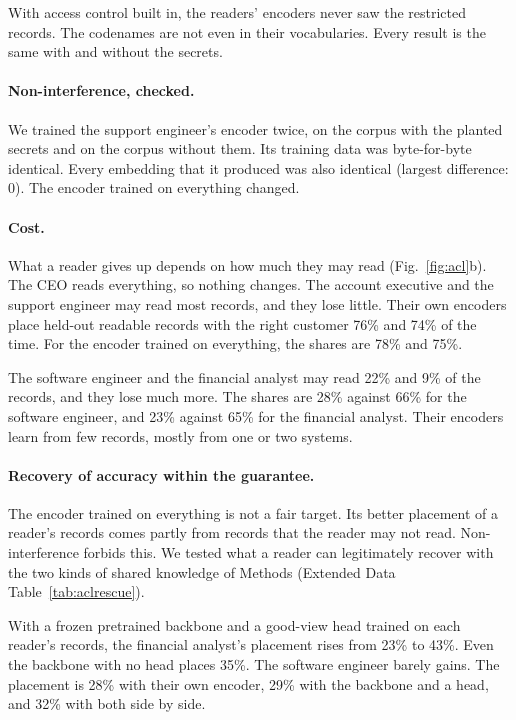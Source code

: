 \documentclass[11pt]{article}
\begin{document}
With access control built in, the readers' encoders never saw the restricted records. The codenames are not even in their vocabularies. Every result is the same with and without the secrets.

\paragraph{Non-interference, checked.} We trained the support engineer's encoder twice, on the corpus with the planted secrets and on the corpus without them. Its training data was byte-for-byte identical. Every embedding that it produced was also identical (largest difference: 0). The encoder trained on everything changed.

\paragraph{Cost.} What a reader gives up depends on how much they may read (Fig.~\ref{fig:acl}b). The CEO reads everything, so nothing changes. The account executive and the support engineer may read most records, and they lose little. Their own encoders place held-out readable records with the right customer 76\% and 74\% of the time. For the encoder trained on everything, the shares are 78\% and 75\%.

The software engineer and the financial analyst may read 22\% and 9\% of the records, and they lose much more. The shares are 28\% against 66\% for the software engineer, and 23\% against 65\% for the financial analyst. Their encoders learn from few records, mostly from one or two systems.

\paragraph{Recovery of accuracy within the guarantee.} The encoder trained on everything is not a fair target. Its better placement of a reader's records comes partly from records that the reader may not read. Non-interference forbids this. We tested what a reader can legitimately recover with the two kinds of shared knowledge of Methods (Extended Data Table~\ref{tab:aclrescue}).

With a frozen pretrained backbone and a good-view head trained on each reader's records, the financial analyst's placement rises from 23\% to 43\%. Even the backbone with no head places 35\%. The software engineer barely gains. The placement is 28\% with their own encoder, 29\% with the backbone and a head, and 32\% with both side by side.
\end{document}
